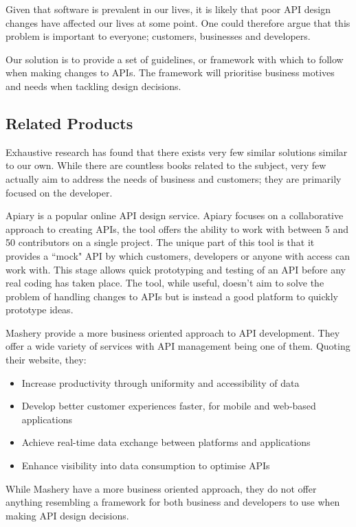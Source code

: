 \documentclass{article}
\begin{document}
Given that software is prevalent in our lives, it is likely that poor API design changes have affected our lives at some point. One could therefore argue that this problem is important to everyone; customers, businesses and developers.

Our solution is to provide a set of guidelines, or framework with which to follow when making changes to APIs. The framework will prioritise business motives and needs when tackling design decisions.

\subsection{Related Products}
Exhaustive research has found that there exists very few similar solutions similar to our own. While there are countless books related to the subject, very few actually aim to address the needs of business and customers; they are primarily focused on the developer.

Apiary is a popular online API design service. Apiary focuses on a collaborative approach to creating APIs, the tool offers the ability to work with between 5 and 50 contributors on a single project. The unique part of this tool is that it provides a ``mock" API by which customers, developers or anyone with access can work with. This stage allows quick prototyping and testing of an API before any real coding has taken place. The tool, while useful, doesn't aim to solve the problem of handling changes to APIs but is instead a good platform to quickly prototype ideas.

Mashery provide a more business oriented approach to API development. They offer a wide variety of services with API management being one of them. Quoting their website, they:

\begin{itemize}
\item Increase productivity through uniformity and accessibility of data
\item Develop better customer experiences faster, for mobile and web-based applications
\item Achieve real-time data exchange between platforms and applications
\item Enhance visibility into data consumption to optimise APIs
\end{itemize}

While Mashery have a more business oriented approach, they do not offer anything resembling a framework for both business and developers to use when making API design decisions.
\end{document}
